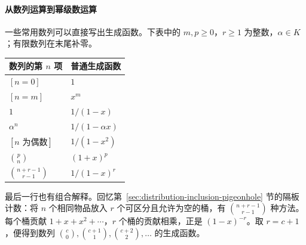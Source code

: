 \documentclass[lang=cn,a4paper,fontset=none,zihao=false,10pt,openany,twoside]{beautybook}
\numberwithin{algorithm}{chapter}
\begin{document}
\paragraph{从数列运算到幂级数运算}
一些常用数列可以直接写出生成函数。下表中的 $m,p\ge0$，$r\ge1$ 为整数，$\alpha\in K$；有限数列在末尾补零。
\begin{center}
\begin{tabular}{@{}ll@{}}
\toprule
数列的第 $n$ 项 & 普通生成函数\\
\midrule
$[n=0]$ & $1$\\[3pt]
$[n=m]$ & $x^m$\\[3pt]
$1$ & $1/(1-x)$\\[3pt]
$\alpha^n$ & $1/(1-\alpha x)$\\[3pt]
$[n\text{ 为偶数}]$ & $1/(1-x^2)$\\[3pt]
$\binom pn$ & $(1+x)^p$\\[3pt]
$\binom{n+r-1}{r-1}$ & $1/(1-x)^r$\\
\bottomrule
\end{tabular}
\end{center}
最后一行也有组合解释。回忆第~\ref{sec:distribution-inclusion-pigeonhole} 节的隔板计数：将 $n$ 个相同物品放入 $r$ 个可区分且允许为空的桶，有 $\binom{n+r-1}{r-1}$ 种方法。每个桶贡献 $1+x+x^2+\cdots$，$r$ 个桶的贡献相乘，正是 $(1-x)^{-r}$。取 $r=c+1$，便得到数列 $\binom c0,\binom{c+1}1,\binom{c+2}2,\ldots$ 的生成函数。
\end{document}

